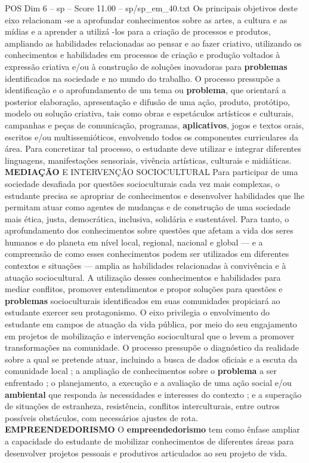 \begin{textsample}{POS Dim 6 – sp – Score 11.00 – sp/sp\_em\_40.txt}
Os principais objetivos deste eixo relacionam -se a aprofundar conhecimentos sobre as artes, a cultura e as mídias e a aprender a utilizá -los para a criação de processos e produtos, ampliando as habilidades relacionadas ao pensar e ao fazer criativo, utilizando os conhecimentos e habilidades em processos de criação e produção voltados à expressão criativa e/ou à construção de soluções inovadoras para \textbf{problemas} identificados na sociedade e no mundo do trabalho.
O processo pressupõe a identificação e o aprofundamento de um tema ou \textbf{problema}, que orientará a posterior elaboração, apresentação e difusão de uma ação, produto, protótipo, modelo ou solução criativa, tais como obras e espetáculos artísticos e culturais, campanhas e peças de comunicação, programas, \textbf{aplicativos}, jogos e textos orais, escritos e/ou multissemióticos, envolvendo todos os componentes curriculares da área.
Para concretizar tal processo, o estudante deve utilizar e integrar diferentes linguagens, manifestações sensoriais, vivência artísticas, culturais e midiáticas. \textbf{MEDIAÇÃO} E INTERVENÇÃO SOCIOCULTURAL Para participar de uma sociedade desafiada por questões socioculturais cada vez mais complexas, o estudante precisa se apropriar de conhecimentos e desenvolver habilidades que lhe permitam atuar como agentes de mudanças e de construção de uma sociedade mais ética, justa, democrática, inclusiva, solidária e sustentável.
Para tanto, o aprofundamento dos conhecimentos sobre questões que afetam a vida dos seres humanos e do planeta em nível local, regional, nacional e global — e a compreensão de como esses conhecimentos podem ser utilizados em diferentes contextos e situações — amplia as habilidades relacionadas à convivência e à atuação sociocultural.
A utilização desses conhecimentos e habilidades para mediar conflitos, promover entendimentos e propor soluções para questões e \textbf{problemas} socioculturais identificados em suas comunidades propiciará ao estudante exercer seu protagonismo.
O eixo privilegia o envolvimento do estudante em campos de atuação da vida pública, por meio do seu engajamento em projetos de mobilização e intervenção sociocultural que o levem a promover transformações na comunidade.
O processo pressupõe o diagnóstico da realidade sobre a qual se pretende atuar, incluindo a busca de dados oficiais e a escuta da comunidade local ; a ampliação de conhecimentos sobre o \textbf{problema} a ser enfrentado ; o planejamento, a execução e a avaliação de uma ação social e/ou \textbf{ambiental} que responda às necessidades e interesses do contexto ; e a superação de situações de estranheza, resistência, conflitos interculturais, entre outros possíveis obstáculos, com necessários ajustes de rota. \textbf{EMPREENDEDORISMO} O \textbf{empreendedorismo} tem como ênfase ampliar a capacidade do estudante de mobilizar conhecimentos de diferentes áreas para desenvolver projetos pessoais e produtivos articulados ao seu projeto de vida.

\end{textsample}
